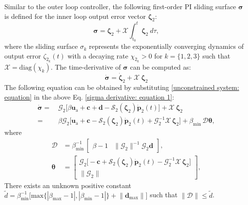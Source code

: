 \documentclass[lettersize,journal]{IEEEtran}
\begin{document}
Similar to the outer loop controller, the following first-order PI sliding surface $\boldsymbol{\sigma}$ is defined for the inner loop output error vector $\boldsymbol{\zeta}_2$:
\begin{equation} \label{sigma: equation}
    \boldsymbol{\sigma} = \boldsymbol{\zeta}_2 + \mathcal{X} \int_{\text{t}_0}^t \boldsymbol{\zeta}_2~d\tau,
\end{equation}
where the sliding surface $\sigma_{k}$ represents the exponentially converging dynamics of output error $\zeta_{2_k}(t)$ with a decaying rate $\chi_{2_k} > 0$ for $k = \{1, 2, 3\}$ such that $\mathcal{X} = \text{diag}(\chi_{k})$.
The time-derivative of $\boldsymbol{\sigma}$ can be computed as:
\begin{equation} \label{sigma derivative: equation 1}
    \dot{\boldsymbol{\sigma}} = \dot{\boldsymbol{\zeta}}_2 + \mathcal{X}~\boldsymbol{\zeta}_2
\end{equation}
The following equation can be obtained by substituting  \eqref{unconstrained system: equation} in the above Eq. \eqref{sigma derivative: equation 1}:
\begin{align}
    \label{sigma derivative: equation 2}
    \dot{\boldsymbol{\sigma}} =& ~\mathcal{G}_2 \big[\beta \boldsymbol{u}_\text{a} + \boldsymbol{c} + \boldsymbol{d} - \mathcal{S}_2(\boldsymbol{\zeta}_2) \dot{\boldsymbol{p}}_2(t) \big] + \mathcal{X}~\boldsymbol{\zeta}_2 \nonumber \\
    = &~ \beta \mathcal{G}_2 \big[\boldsymbol{u}_\text{a} +  \boldsymbol{c} - \mathcal{S}_2(\boldsymbol{\zeta}_2) \dot{\boldsymbol{p}}_2(t) + \mathcal{G}_2^{-1} \mathcal{X}\,\boldsymbol{\zeta}_2 \big] + \beta_{\min} \, \mathcal{D} \boldsymbol{\theta}, 
\end{align}
where 
\begin{align*}
    \mathcal{D} &= \beta_{\min}^{-1} \, \begin{bmatrix} \beta - 1 & \lVert \mathcal{G}_2 \rVert^{-1} \mathcal{G}_2 \boldsymbol{d} \end{bmatrix}, \\
    \boldsymbol{\theta} &= \begin{bmatrix}
    \mathcal{G}_2 \big[- \boldsymbol{c} + \mathcal{S}_2(\boldsymbol{\zeta}_2) \dot{\boldsymbol{p}}_2(t) - \mathcal{G}_{2}^{-1} \mathcal{X}\,\boldsymbol{\zeta}_2 \big] \\ \lVert \mathcal{G}_2 \rVert
    \end{bmatrix},
\end{align*}
There exists an unknown positive constant $\tilde{d} = \beta_{\min}^{-1} \Big[\text{max}\{|\beta_{\max}{-}1|,|\beta_{\min}{-}1|\} + \lVert \boldsymbol{d}_{\max} \rVert \Big]$ such that $\lVert\mathcal{D}\rVert\leq\tilde{d}$.
 
\end{document}
